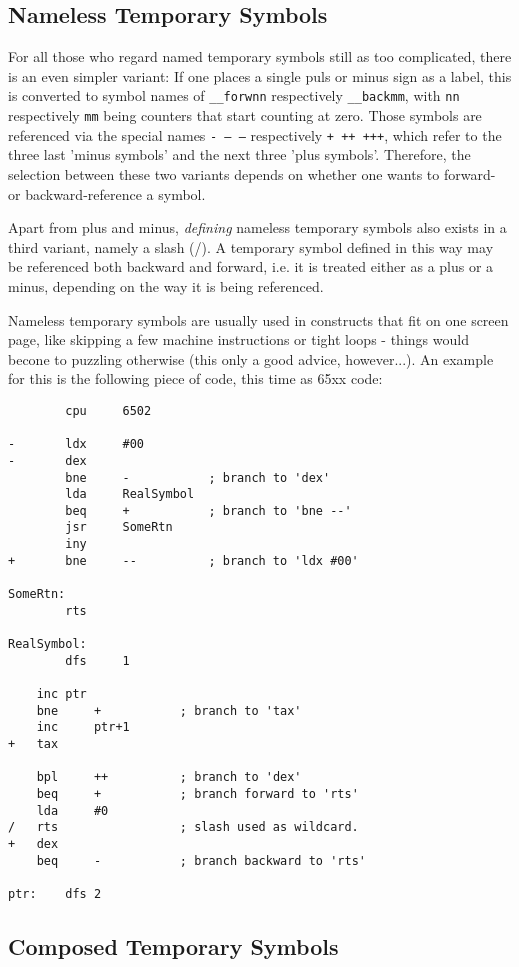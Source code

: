 \documentclass[12pt,twoside]{report}
\begin{document}
\subsection{Nameless Temporary Symbols}

For all those who regard named temporary symbols still as too complicated,
there is an even simpler variant: If one places a single puls or minus
sign as a label, this is converted to symbol names of {\tt \_\_forwnn}
respectively {\tt \_\_backmm}, with {\tt nn} respectively {\tt mm} being
counters that start counting at zero.  Those symbols are referenced via
the special names {\tt - -- ---} respectively {\tt + ++ +++}, which refer
to the three last 'minus symbols' and the next three 'plus symbols'.
Therefore, the selection between these two variants depends on whether one
wants to forward- or backward-reference a symbol.

Apart from plus and minus, {\em defining} nameless temporary symbols also
exists in a third variant, namely a slash (/).  A temporary symbol defined
in this way may be referenced both backward and forward, i.e. it is
treated either as a plus or a minus, depending on the way it is being
referenced.

Nameless temporary symbols are usually used in constructs that fit on one
screen page, like skipping a few machine instructions or tight loops -
things would becone to puzzling otherwise (this only a good advice,
however...).  An example for this is the following piece of code, this
time as 65xx code:
\begin{verbatim}
        cpu     6502

-       ldx     #00
-       dex
        bne     -           ; branch to 'dex'
        lda     RealSymbol
        beq     +           ; branch to 'bne --'
        jsr     SomeRtn
        iny
+       bne     --          ; branch to 'ldx #00'

SomeRtn:
        rts

RealSymbol:
        dfs     1

  	inc	ptr
   	bne 	+      	    ; branch to 'tax'
   	inc 	ptr+1
+ 	tax

 	bpl 	++     	    ; branch to 'dex'
   	beq 	+      	    ; branch forward to 'rts'
   	lda 	#0
/  	rts            	    ; slash used as wildcard.
+ 	dex
   	beq 	-           ; branch backward to 'rts'

ptr:	dfs	2
\end{verbatim}

\subsection{Composed Temporary Symbols}
\end{document}
